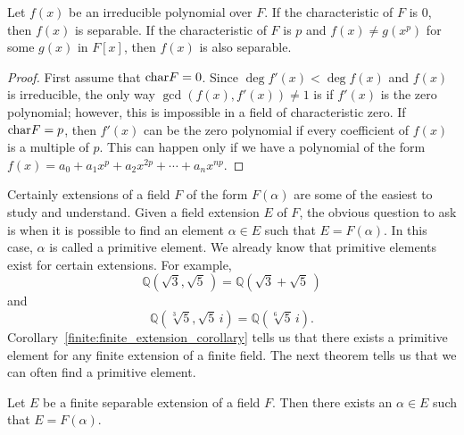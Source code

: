 \begin{proposition}
Let $f(x)$ be an irreducible polynomial over $F$. If the
characteristic of $F$ is $0$, then $f(x)$ is separable.  If the
characteristic of $F$ is $p$ and $f(x) \neq g(x^p)$ for some $g(x)$
in $F[x]$, then $f(x)$ is also separable.
\end{proposition}
 
 
\begin{proof}
First assume that ${\rm char } F = 0$. Since $\deg f'(x) < \deg f(x)$ 
and $f(x)$ is irreducible, the only way $\gcd( f(x), f'(x)) \neq 1$ is
if $f'(x)$ is the zero polynomial; however, this is impossible in
a field of characteristic zero. If ${\rm char } F = p$, then $f'(x)$
can be the zero polynomial if every coefficient of $f(x)$ is a
multiple of $p$.  This can happen only if we have a polynomial of the
form $f(x) = a_0 + a_1 x^p + a_2 x^{2p} + \cdots + a_n x^{np}$. 
\end{proof}
 
 
\medskip
 
 
Certainly extensions of a field $F$ of the form $F(\alpha)$ are some
of the easiest to study and understand.  Given a field extension $E$
of $F$, the obvious question to ask is when it is possible to find an
element $\alpha \in E$ such that $E = F( \alpha )$. In this case,
$\alpha$ is called a {\bfi primitive
element}. We already
know that primitive elements exist for certain extensions. For example,
\[
{\mathbb Q}( \sqrt{3}, \sqrt{5}\, ) = {\mathbb Q}( \sqrt{3} + \sqrt{5}\, )
\]
and
\[
{\mathbb Q}( \sqrt[3]{5}, \sqrt{5}\, i ) = {\mathbb Q}( \sqrt[6]{5}\, i ).
\]
Corollary~\ref{finite:finite_extension_corollary} tells us that there exists a primitive element for any 
finite extension of a finite field. The next theorem tells us that we 
can often find a primitive element.
 
 
\begin{theorem}\label{galois:primitive_element_theorem}
Let $E$ be a finite separable extension of a field $F$. Then there
exists an $\alpha \in E$ such that $E=F( \alpha )$. 
\end{theorem}
 
